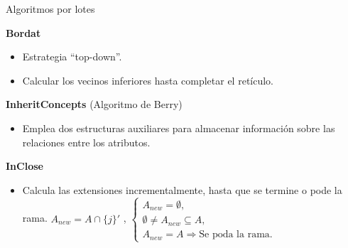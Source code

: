 \documentclass{beamer}
\begin{document}
     \begin{frame}{Algoritmos por lotes}
    
    \begin{block}{\textbf{Bordat}}
    \begin{itemize}
    \item Estrategia ``top-down''.
    
    \item Calcular los vecinos inferiores hasta completar el retículo.
    \end{itemize}
    \end{block}
    \pause
    \begin{block}{\textbf{InheritConcepts} (Algoritmo de Berry)}
    \begin{itemize}
    \item Emplea dos estructuras auxiliares para almacenar información sobre las relaciones entre los atributos.
    \end{itemize}
    \end{block}
    \pause
    \begin{block}{\textbf{InClose}}
    \begin{itemize}
    \item Calcula las extensiones incrementalmente, hasta que se termine o pode la rama.
      $A_{new}= A \cap \{j\}'$ , $\begin{cases} A_{new}=\emptyset,  \\
      \emptyset \neq A_{new} \subseteq A, \\
      A_{new} = A \Longrightarrow \text{Se poda la rama}.
      \end{cases}$
     \end{itemize}
     \end{block}
  \end{frame}
  
\end{document}
